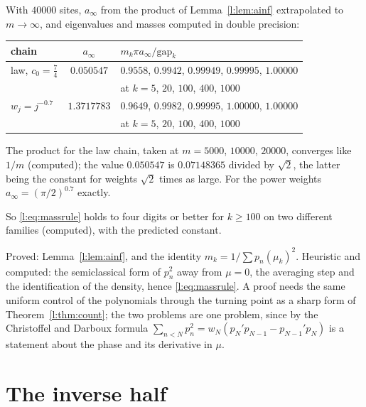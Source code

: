 \begin{remark}\label{l:comp:massrule}
With $40000$ sites, $a_\infty$ from the product of Lemma~\ref{l:lem:ainf} extrapolated to $m\to\infty$, and eigenvalues and masses computed in double precision:
\begin{center}\small
\begin{tabular}{@{}l@{\ \ }c@{\ \ }l@{}}
\toprule
chain & $a_\infty$ & $m_k\pi a_\infty/\mathrm{gap}_k$\\
\midrule
law, $c_0=\frac74$ & $0.050547$ & $0.9558$, $0.9942$, $0.99949$, $0.99995$, $1.00000$\\
 & & at $k=5$, $20$, $100$, $400$, $1000$\\
$w_j=j^{-0.7}$ & $1.3717783$ & $0.9649$, $0.9982$, $0.99995$, $1.00000$, $1.00000$\\
 & & at $k=5$, $20$, $100$, $400$, $1000$\\
\bottomrule
\end{tabular}
\end{center}
The product for the law chain, taken at $m=5000$, $10000$, $20000$, converges like $1/m$ (computed); the value $0.050547$ is $0.07148365$ divided by $\sqrt2$, the latter being the constant for weights $\sqrt2$ times as large. For the power weights $a_\infty=(\pi/2)^{0.7}$ exactly.\end{remark}

So \eqref{l:eq:massrule} holds to four digits or better for $k\ge100$ on two different families (computed), with the predicted constant.

\begin{remark}
Proved: Lemma~\ref{l:lem:ainf}, and the identity $m_k=1/\sum p_n(\mu_k)^2$. Heuristic and computed: the semiclassical form of $p_n^2$ away from $\mu=0$, the averaging step and the identification of the density, hence \eqref{l:eq:massrule}. A proof needs the same uniform control of the polynomials through the turning point as a sharp form of Theorem~\ref{l:thm:count}; the two problems are one problem, since by the Christoffel and Darboux formula $\sum_{n<N}p_n^2=w_N(p_N'p_{N-1}-p_{N-1}'p_N)$ is a statement about the phase and its derivative in $\mu$.
\end{remark}

\section{The inverse half}\label{l:sec:inverse}

